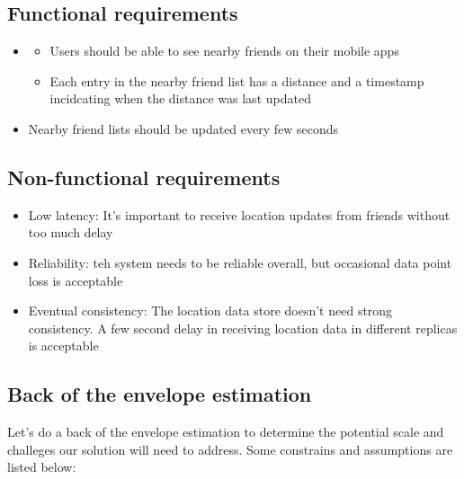\documentclass{report}
\theoremstyle{definition}
\let\oldsubsection\subsection
\renewcommand{\subsection}{\oldsubsection*}
\begin{document}
\subsection{Functional requirements}

\begin{itemize}
\item
\begin{itemize}
\item
Users should be able to see nearby friends on their mobile apps
\item
Each entry in the nearby friend list has a distance and a timestamp incidcating when the distance was last updated
\end{itemize}
\item
Nearby friend lists should be updated every few seconds
\end{itemize}

\subsection{Non-functional requirements}

\begin{itemize}
\item
Low latency: It's important to receive location updates from friends without too much delay
\item
Reliability: teh system needs to be reliable overall, but occasional data point loss is acceptable
\item
Eventual consistency: The location data store doesn't need strong consistency. A few second delay in receiving location data in
different replicas is acceptable
\end{itemize}

\subsection{Back of the envelope estimation}

Let's do a back of the envelope estimation to determine the potential scale and challeges  our solution will need to address. Some constrains and assumptions are listed below:
\end{document}
